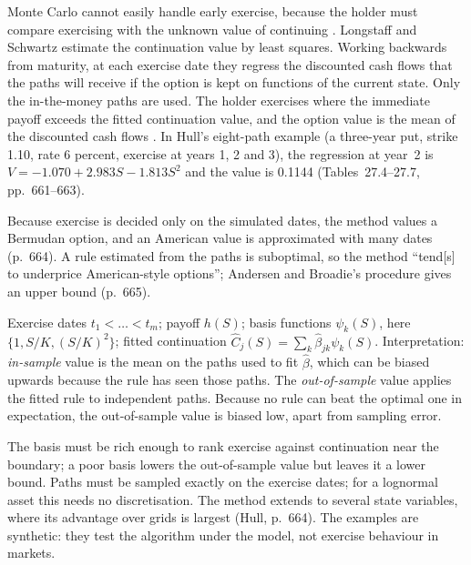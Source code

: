 \begin{qfmethod}\label{meth:least-squares-monte-carlo}
 Monte Carlo cannot easily handle early exercise, because the holder must compare exercising with the unknown value of continuing \citep[chap.~21, sec.~21.6, p.~491]{s7-hulloptions}. Longstaff and Schwartz estimate the continuation value by least squares. Working backwards from maturity, at each exercise date they regress the discounted cash flows that the paths will receive if the option is kept on functions of the current state. Only the in-the-money paths are used. The holder exercises where the immediate payoff exceeds the fitted continuation value, and the option value is the mean of the discounted cash flows \citep[chap.~27, sec.~27.8, pp.~660--664]{s7-hulloptions}. In Hull's eight-path example (a three-year put, strike 1.10, rate 6 percent, exercise at years 1, 2 and 3), the regression at year~2 is $V=-1.070+2.983S-1.813S^2$ and the value is 0.1144 (Tables~27.4--27.7, pp.~661--663).

Because exercise is decided only on the simulated dates, the method values a Bermudan option, and an American value is approximated with many dates (p.~664). A rule estimated from the paths is suboptimal, so the method ``tend[s] to underprice American-style options''; Andersen and Broadie's procedure gives an upper bound (p.~665).

 Exercise dates $t_1<\dots<t_m$; payoff $h(S)$; basis functions $\psi_k(S)$, here $\{1,S/K,(S/K)^2\}$; fitted continuation $\hat C_j(S)=\sum_k\hat\beta_{jk}\psi_k(S)$. Interpretation: \emph{in-sample} value is the mean on the paths used to fit $\hat\beta$, which can be biased upwards because the rule has seen those paths. The \emph{out-of-sample} value applies the fitted rule to independent paths. Because no rule can beat the optimal one in expectation, the out-of-sample value is biased low, apart from sampling error.

 The basis must be rich enough to rank exercise against continuation near the boundary; a poor basis lowers the out-of-sample value but leaves it a lower bound. Paths must be sampled exactly on the exercise dates; for a lognormal asset this needs no discretisation. The method extends to several state variables, where its advantage over grids is largest (Hull, p.~664). The examples are synthetic: they test the algorithm under the model, not exercise behaviour in markets.


\end{qfmethod}
